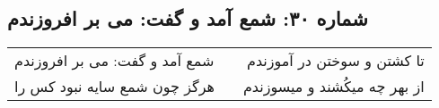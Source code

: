 \begin{center}
\section*{شماره ۳۰: شمع آمد و گفت: می بر افروزندم}
\label{sec:030}
\begin{longtable}{l p{0.5cm} r}
شمع آمد و گفت: می بر افروزندم
&&
تا کشتن و سوختن در آموزندم
\\
هرگز چون شمع سایه نبود کس را
&&
از بهر چه میکُشند و میسوزندم
\\
\end{longtable}
\end{center}
